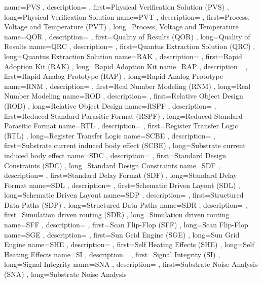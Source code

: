 { name={PVS}
, description={}
, first={Physical Verification Solution (PVS)}
, long={Physical Verification Solution}
}
{ name={PVT}
, description={}
, first={Process, Voltage and Temperature (PVT)}
, long={Process, Voltage and Temperature}
}
{ name={QOR}
, description={}
, first={Quality of Results (QOR)}
, long={Quality of Results}
}
{ name={QRC}
, description={}
, first={Quantus Extraction Solution (QRC)}
, long={Quantus Extraction Solution}
}
{ name={RAK}
, description={}
, first={Rapid Adoption Kit (RAK)}
, long={Rapid Adoption Kit}
}
{ name={RAP}
, description={}
, first={Rapid Analog Prototype (RAP)}
, long={Rapid Analog Prototype}
}
{ name={RNM}
, description={}
, first={Real Number Modeling (RNM)}
, long={Real Number Modeling}
}
{ name={ROD}
, description={}
, first={Relative Object Design (ROD)}
, long={Relative Object Design}
}
{ name={RSPF}
, description={}
, first={Reduced Standard Parasitic Format (RSPF)}
, long={Reduced Standard Parasitic Format}
}
{ name={RTL}
, description={}
, first={Register Transfer Logic (RTL)}
, long={Register Transfer Logic}
}
{ name={SCBE}
, description={}
, first={Substrate current induced body effect (SCBE)}
, long={Substrate current induced body effect}
}
{ name={SDC}
, description={}
, first={Standard Design Constraints (SDC)}
, long={Standard Design Constraints}
}
{ name={SDF}
, description={}
, first={Standard Delay Format (SDF)}
, long={Standard Delay Format}
}
{ name={SDL}
, description={}
, first={Schematic Driven Layout (SDL)}
, long={Schematic Driven Layout}
}
{ name={SDP}
, description={}
, first={Structured Data Paths (SDP)}
, long={Structured Data Paths}
}
{ name={SDR}
, description={}
, first={Simulation driven routing (SDR)}
, long={Simulation driven routing}
}
{ name={SFF}
, description={}
, first={Scan Flip-Flop (SFF)}
, long={Scan Flip-Flop}
}
{ name={SGE}
, description={}
, first={Sun Grid Engine (SGE)}
, long={Sun Grid Engine}
}
{ name={SHE}
, description={}
, first={Self Heating Effects (SHE)}
, long={Self Heating Effects}
}
{ name={SI}
, description={}
, first={Signal Integrity (SI)}
, long={Signal Integrity}
}
{ name={SNA}
, description={}
, first={Substrate Noise Analysis (SNA)}
, long={Substrate Noise Analysis}
}

